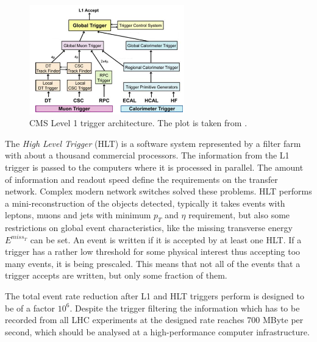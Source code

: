 \begin{figure}[t]
  \centering
  \includegraphics[width=0.6\textwidth]{02_experimental_setup/plots/img_l1.png}
  \caption{CMS Level 1 trigger architecture. The plot is taken from \cite{CMSatLHC}.}
  \label{fig:trigA}
\end{figure}

The \textit{High Level Trigger} (HLT) is a software system represented by a filter farm with about a thousand commercial processors. The information
from the L1 trigger is passed to the computers where it is processed in parallel. The amount of information and readout speed define the requirements
on the transfer network. Complex modern network switches solved these problems. HLT performs a mini-reconstruction of the objects detected,
typically it takes events with leptons, muons and jets with minimum $p_{T}$ and $\eta$ requirement, but also some restrictions on global
event characteristics, like the missing transverse energy $E^{miss_{T}}$ can be set. An event is written if it is accepted by at least one HLT.
If a trigger has a rather low threshold for some physical interest thus accepting too many events, it is being prescaled. This means that not 
all of the events that a trigger accepts are written, but only some fraction of them.

The total event rate reduction after L1 and HLT triggers perform is designed to be of a factor $10^{6}$. Despite the trigger filtering
the information which has to be recorded from all LHC experiments at the designed rate reaches 700 MByte per second, which should be analysed 
at a high-performance computer infrastructure\cite{CMScompTDR}.
% 
